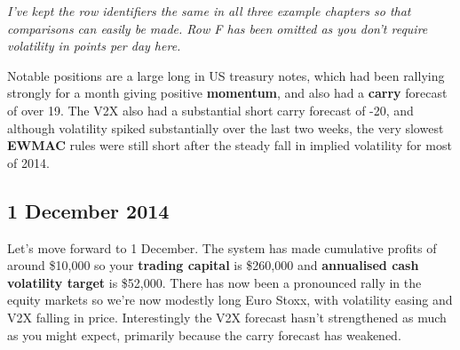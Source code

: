 \smallskip \noindent\textit{I've kept the row identifiers the same in all three example chapters so that comparisons can easily be made. Row F has been omitted as you don't require volatility in points per day here.}

\medskip


Notable positions are a large long in US treasury notes, which had been rallying strongly for a month giving positive \textbf{momentum}, and also had a \textbf{carry} forecast of over 19. The V2X also had a substantial short carry forecast of -20, and although volatility spiked substantially over the last two weeks, the very slowest \textbf{EWMAC} rules were still short after the steady fall in implied volatility for most of 2014.

\subsection*{1 December 2014}

Let's move forward to 1 December. The system has made cumulative profits of around \$10,000 so your \textbf{trading capital} is \$260,000 and \textbf{annualised cash volatility target} is \$52,000. There has now been a pronounced rally in the equity markets so we're now modestly long Euro Stoxx, with volatility easing and V2X falling in price. Interestingly the V2X forecast hasn't strengthened as much as you might expect, primarily because the carry forecast has weakened.

